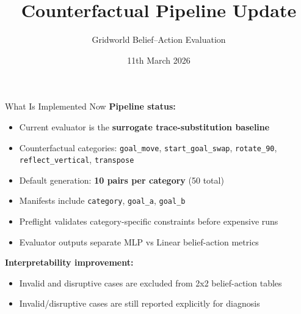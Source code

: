 \documentclass[aspectratio=169]{beamer}
\title{Counterfactual Pipeline Update}
\subtitle{Gridworld Belief--Action Evaluation}
\author{}
\date{11th March 2026}
\begin{document}
\begin{frame}
  \titlepage
\end{frame}

\begin{frame}{What Is Implemented Now}
\textbf{Pipeline status:}
\begin{itemize}
  \item Current evaluator is the \textbf{surrogate trace-substitution baseline}
  \item Counterfactual categories: \texttt{goal\_move}, \texttt{start\_goal\_swap}, \texttt{rotate\_90}, \texttt{reflect\_vertical}, \texttt{transpose}
  \item Default generation: \textbf{10 pairs per category} (50 total)
  \item Manifests include \texttt{category}, \texttt{goal\_a}, \texttt{goal\_b}
  \item Preflight validates category-specific constraints before expensive runs
  \item Evaluator outputs separate MLP vs Linear belief-action metrics
\end{itemize}

\vspace{0.4em}
\textbf{Interpretability improvement:}
\begin{itemize}
  \item Invalid and disruptive cases are excluded from 2x2 belief-action tables
  \item Invalid/disruptive cases are still reported explicitly for diagnosis
\end{itemize}
\end{frame}
\end{document}
